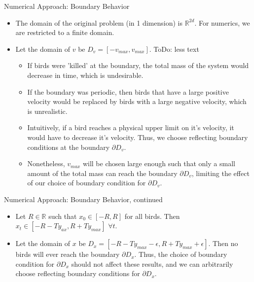 \documentclass{beamer}
\begin{document}
\begin{frame}{Numerical Approach: Boundary Behavior}
	\begin{itemize}
		\item {
			The domain of the original problem (in 1 dimension) is $\mathbb{R}^{2d}$. For numerics, we are restricted to a finite domain.
		}
		\item {
			Let the domain of $v$ be $D_v =[-v_{max},v_{max}]$.
			ToDo: less text
			\begin{itemize}
				\item If birds were 'killed' at the boundary, the total mass of the system would decrease in time, which is undesirable.
				\item If the boundary was periodic, then birds that have a large positive velocity would be replaced by birds with a large negative velocity, which is unrealistic.
				\item Intuitively, if a bird reaches a physical upper limit on it's velocity, it would have to decrease it's velocity. Thus, we choose reflecting boundary conditions at the boundary $\partial D_v$.
				\item Nonetheless, $v_{max}$ will be chosen large enough such that only a small amount of the total mass can reach the boundary $\partial D_v$, limiting the effect of our choice of boundary condition for $\partial D_v$.
			\end{itemize}
		}
	\end{itemize}
\end{frame}

\begin{frame}{Numerical Approach: Boundary Behavior, continued}
	\begin{itemize}
		\item {
			Let $R \in \mathbb{R}$ such that $x_0 \in [-R,R]$ for all birds. Then $x_t \in [-R-Ty_{ax},R+T y_{max}]$ $\forall t$.
		}
		\item {
			Let the domain of $x$ be $D_x =[-R-Ty_{max}-\epsilon,R+T y_{max}+\epsilon]$. Then no birds will ever reach the boundary $\partial D_x$. Thus, the choice of boundary condition for $\partial D_x$ should not affect these results, and we can arbitrarily choose reflecting boundary conditions for $\partial D_x$.
		}
	\end{itemize}
\end{frame}
\end{document}
